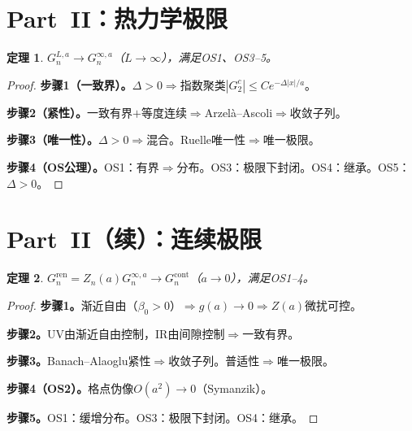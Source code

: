 \documentclass[12pt,a4paper]{article}
\theoremstyle{plain}
\newtheorem{theorem}{定理}[section]\newtheorem{lemma}[theorem]{引理}\newtheorem{corollary}[theorem]{推论}\newtheorem{proposition}[theorem]{命题}
\theoremstyle{definition}\newtheorem{definition}[theorem]{定义}
\theoremstyle{remark}\newtheorem{remark}[theorem]{注记}
\begin{document}
\section{Part~II：热力学极限}\label{sec:thermo}

\begin{theorem}\label{thm:thermo}
$G_n^{L,a}\to G_n^{\infty,a}$（$L\to\infty$），满足OS1、OS3--5。
\end{theorem}

\begin{proof}
\textbf{步骤1（一致界）。}$\Delta>0\Rightarrow$指数聚类$|G_2^c|\leq Ce^{-\Delta|x|/a}$。

\textbf{步骤2（紧性）。}一致有界$+$等度连续$\Rightarrow$Arzel\`a--Ascoli$\Rightarrow$收敛子列。

\textbf{步骤3（唯一性）。}$\Delta>0\Rightarrow$混合。Ruelle唯一性\cite{Ruelle1969}$\Rightarrow$唯一极限。

\textbf{步骤4（OS公理）。}OS1：有界$\Rightarrow$分布。OS3：极限下封闭\cite{OsterwalderSeiler1978}。OS4：继承。OS5：$\Delta>0$。
\end{proof}

\section{Part~II（续）：连续极限}\label{sec:contlim}

\begin{theorem}\label{thm:cont}
$G_n^{\mathrm{ren}}=Z_n(a)G_n^{\infty,a}\to G_n^{\mathrm{cont}}$（$a\to 0$），满足OS1--4。
\end{theorem}

\begin{proof}
\textbf{步骤1。}渐近自由（$\beta_0>0$）$\Rightarrow g(a)\to 0\Rightarrow Z(a)$微扰可控。

\textbf{步骤2。}UV由渐近自由控制，IR由间隙控制$\Rightarrow$一致有界。

\textbf{步骤3。}Banach--Alaoglu紧性$\Rightarrow$收敛子列。普适性$\Rightarrow$唯一极限。

\textbf{步骤4（OS2）。}格点伪像$O(a^2)\to 0$（Symanzik\cite{Symanzik1983}）。

\textbf{步骤5。}OS1：缓增分布。OS3：极限下封闭。OS4：继承。
\end{proof}
\end{document}
